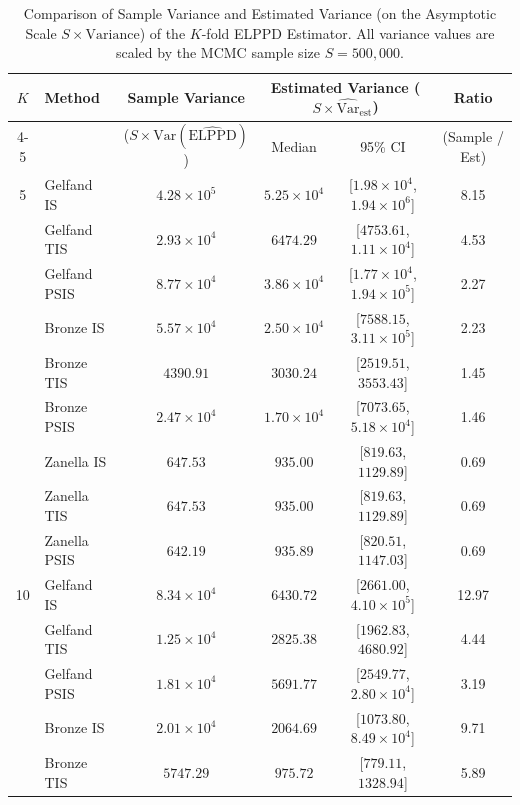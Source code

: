 \begin{table}[ht]
\centering
\caption{Comparison of Sample Variance and Estimated Variance (on the Asymptotic Scale $S \times \text{Variance}$) of the $K$-fold ELPPD Estimator. All variance values are scaled by the MCMC sample size $S = 500,000$.}
\label{tab:elppd_variance_comparison}
\begin{tabular}{clcccc}
\toprule
\multirow{2.5}{*}{$K$} & \multirow{2.5}{*}{Method} & Sample Variance & \multicolumn{2}{c}{Estimated Variance ($S \times \widehat{\text{Var}}_{\text{est}}$)} & Ratio \\
\cmidrule(lr){4-5}
 & & ($S \times \text{Var}(\widehat{\text{ELPPD}})$) & Median & 95\% CI & (Sample / Est) \\
\midrule
\multirow{9.5}{*}{5} & Gelfand IS & $4.28 \times 10^{5}$ & $5.25 \times 10^{4}$ & [$1.98 \times 10^{4}$, $1.94 \times 10^{6}$] & 8.15 \\
 & Gelfand TIS & $2.93 \times 10^{4}$ & $6474.29$ & [$4753.61$, $1.11 \times 10^{4}$] & 4.53 \\
 & Gelfand PSIS & $8.77 \times 10^{4}$ & $3.86 \times 10^{4}$ & [$1.77 \times 10^{4}$, $1.94 \times 10^{5}$] & 2.27 \\
 & Bronze IS & $5.57 \times 10^{4}$ & $2.50 \times 10^{4}$ & [$7588.15$, $3.11 \times 10^{5}$] & 2.23 \\
 & Bronze TIS & $4390.91$ & $3030.24$ & [$2519.51$, $3553.43$] & 1.45 \\
 & Bronze PSIS & $2.47 \times 10^{4}$ & $1.70 \times 10^{4}$ & [$7073.65$, $5.18 \times 10^{4}$] & 1.46 \\
 & Zanella IS & $647.53$ & $935.00$ & [$819.63$, $1129.89$] & 0.69 \\
 & Zanella TIS & $647.53$ & $935.00$ & [$819.63$, $1129.89$] & 0.69 \\
 & Zanella PSIS & $642.19$ & $935.89$ & [$820.51$, $1147.03$] & 0.69 \\
\midrule
\multirow{9.5}{*}{10} & Gelfand IS & $8.34 \times 10^{4}$ & $6430.72$ & [$2661.00$, $4.10 \times 10^{5}$] & 12.97 \\
 & Gelfand TIS & $1.25 \times 10^{4}$ & $2825.38$ & [$1962.83$, $4680.92$] & 4.44 \\
 & Gelfand PSIS & $1.81 \times 10^{4}$ & $5691.77$ & [$2549.77$, $2.80 \times 10^{4}$] & 3.19 \\
 & Bronze IS & $2.01 \times 10^{4}$ & $2064.69$ & [$1073.80$, $8.49 \times 10^{4}$] & 9.71 \\
 & Bronze TIS & $5747.29$ & $975.72$ & [$779.11$, $1328.94$] & 5.89 \\

\end{tabular}
\end{table}
